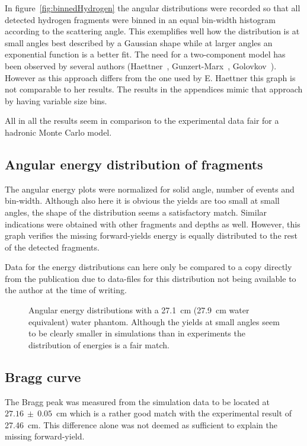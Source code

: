 In figure~\ref{fig:binnedHydrogen} the angular distributions were recorded so that all detected hydrogen fragments were binned in an equal bin-width histogram according to the scattering angle. This exemplifies well how the distribution is at small angles best described by a Gaussian shape while at larger angles an exponential function is a better fit. The need for a two-component model has been observed by several authors (Haettner~\cite{ehaettner}, Gunzert-Marx~\cite{gunzert-marx}, Golovkov~\cite{golovkov}). However as this approach differs from the one used by E. Haettner this graph is not comparable to her results. The results in the appendices mimic that approach by having variable size bins.

All in all the results seem in comparison to the experimental data fair for a hadronic Monte Carlo model.

\subsection{Angular energy distribution of fragments}
The angular energy plots were normalized for solid angle, number of events and bin-width. Although also here it is obvious the yields are too small at small angles, the shape of the distribution seems a satisfactory match. Similar indications were obtained with other fragments and depths as well. However, this graph verifies the missing forward-yields energy is equally distributed to the rest of the detected fragments.

Data for the energy distributions can here only be compared to a copy directly from the publication due to data-files for this distribution not being available to the author at the time of writing.

\begin{figure}[!ht]
\centering
{}
\label{fig:AngularEnergyDistribution}
\caption[Optional caption for list of figures]{Angular energy distributions with a 27.1~cm (27.9~cm water equivalent) water phantom. Although the yields at small angles seem to be clearly smaller in simulations than in experiments the distribution of energies is a fair match.}
\end{figure}

\subsection{Bragg curve}
The Bragg peak was measured from the simulation data to be located at $27.16~\pm~0.05$~cm which is a rather good match with the experimental result of 27.46~cm. This difference alone was not deemed as sufficient to explain the missing forward-yield.

